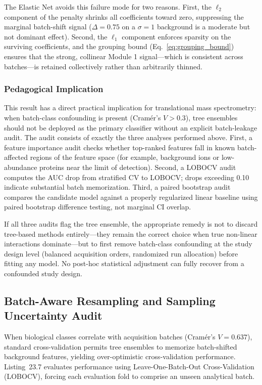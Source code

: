 \documentclass[11pt,oneside]{book}
\begin{document}
The Elastic Net avoids this failure mode for two reasons. First, the $\ell_2$ component of the penalty shrinks all coefficients toward zero, suppressing the marginal batch-shift signal ($\Delta = 0.75$ on a $\sigma = 1$ background is a moderate but not dominant effect). Second, the $\ell_1$ component enforces sparsity on the surviving coefficients, and the grouping bound (Eq.~\ref{eq:grouping_bound}) ensures that the strong, collinear Module 1 signal---which is consistent across batches---is retained collectively rather than arbitrarily thinned.

\subsubsection{Pedagogical Implication}
This result has a direct practical implication for translational mass spectrometry: when batch-class confounding is present (Cram\'er's $V > 0.3$), tree ensembles should not be deployed as the primary classifier without an explicit batch-leakage audit. The audit consists of exactly the three analyses performed above. First, a feature importance audit checks whether top-ranked features fall in known batch-affected regions of the feature space (for example, background ions or low-abundance proteins near the limit of detection). Second, a LOBOCV audit computes the AUC drop from stratified CV to LOBOCV; drops exceeding 0.10 indicate substantial batch memorization. Third, a paired bootstrap audit compares the candidate model against a properly regularized linear baseline using paired bootstrap difference testing, not marginal CI overlap.

If all three audits flag the tree ensemble, the appropriate remedy is not to discard tree-based methods entirely---they remain the correct choice when true non-linear interactions dominate---but to first remove batch-class confounding at the study design level (balanced acquisition orders, randomized run allocation) before fitting any model. No post-hoc statistical adjustment can fully recover from a confounded study design.

\subsection{Batch-Aware Resampling and Sampling Uncertainty Audit}

When biological classes correlate with acquisition batches (Cram\'er's $V = 0.637$), standard cross-validation permits tree ensembles to memorize batch-shifted background features, yielding over-optimistic cross-validation performance. Listing~23.7 evaluates performance using Leave-One-Batch-Out Cross-Validation (LOBOCV), forcing each evaluation fold to comprise an unseen analytical batch.
\end{document}
